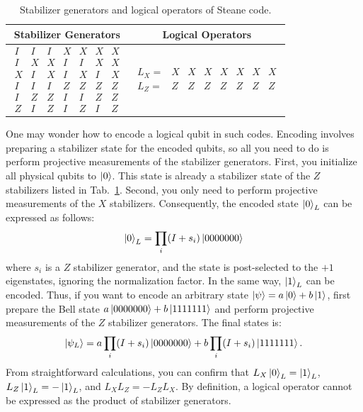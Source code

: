 \documentclass[a4paper,11pt]{ltjsarticle}
\begin{document}
{{{            \begin{table}[h]
                \centering
                \caption{Stabilizer generators and logical operators of Steane code.}
                \label{steane_code}
                \begin{tabular}{cc}
                    \hline
                    Stabilizer Generators & Logical Operators\\
                    \hline
                    {\setlength{\arraycolsep}{1pt}
                    $\begin{array}{ccccccc}
                        I&I&I&X&X&X&X\\
                        I&X&X&I&I&X&X\\
                        X&I&X&I&X&I&X\\
                        I&I&I&Z&Z&Z&Z\\
                        I&Z&Z&I&I&Z&Z\\
                        Z&I&Z&I&Z&I&Z
                    \end{array}$}&{\setlength{\arraycolsep}{1pt}
                    $\begin{array}{cccccccc}
                        L_X=&X&X&X&X&X&X&X\\
                        L_Z=&Z&Z&Z&Z&Z&Z&Z
                    \end{array}$}\\
                    \hline
                \end{tabular}
            \end{table}

            One may wonder how to encode a logical qubit in such codes. Encoding involves preparing a stabilizer state for the encoded qubits, so all you need to do is perform projective measurements of the stabilizer generators. First, you initialize all physical qubits to $\ket{0}$. This state is already a stabilizer state of the $Z$ stabilizers listed in Tab.~\ref{steane_code}. Second, you only need to perform projective measurements of the $X$ stabilizers. Consequently, the encoded state $\ket{0}_L$ can be expressed as follows:
            \begin{align*}
                \ket{0}_L=\prod_{i}(I+s_i)\ket{0000000}
            \end{align*}
            where $s_i$ is a $Z$ stabilizer generator, and the state is post-selected to the $+1$ eigenstates, ignoring the normalization factor. In the same way, $\ket{1}_L$ can be encoded. Thus, if you want to encode an arbitrary state $\ket{\psi} = a\ket{0} + b\ket{1}$, first prepare the Bell state $a\ket{0000000} + b\ket{1111111}$ and perform projective measurements of the $Z$ stabilizer generators. The final states is:
            \begin{align*}
                \ket{\psi_L}=a\prod_{i}(I+s_i)\ket{0000000}+b\prod_{i}(I+s_i)\ket{1111111}.
            \end{align*}
            From straightforward calculations, you can confirm that $L_X\ket{0}_L = \ket{1}_L$, $L_Z\ket{1}_L = -\ket{1}_L$, and $L_XL_Z = -L_ZL_X$. By definition, a logical operator cannot be expressed as the product of stabilizer generators.

}}}
\end{document}
